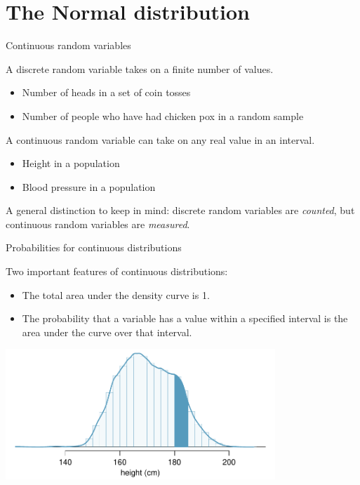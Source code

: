 \documentclass[ignorenonframetext,aspectratio=169]{beamer}
\begin{document}
\section{The Normal distribution}\label{the-normal-distribution}

\begin{frame}{Continuous random variables}

A discrete random variable takes on a finite number of values.

\begin{itemize}
\item
  Number of heads in a set of coin tosses
\item
  Number of people who have had chicken pox in a random sample
\end{itemize}

A continuous random variable can take on any real value in an interval.

\begin{itemize}
\item
  Height in a population
\item
  Blood pressure in a population
\end{itemize}

A general distinction to keep in mind: discrete random variables are
\emph{counted}, but continuous random variables are \emph{measured}.

\end{frame}

\begin{frame}{Probabilities for continuous distributions}

Two important features of continuous distributions:

\begin{itemize}
\item
  The total area under the density curve is 1.
\item
  The probability that a variable has a value within a specified
  interval is the area under the curve over that interval.
\end{itemize}

\begin{center}
\includegraphics[width=4in]{figures/fdicHeightContDistFilled.pdf}
\end{center}

\end{frame}
\end{document}
